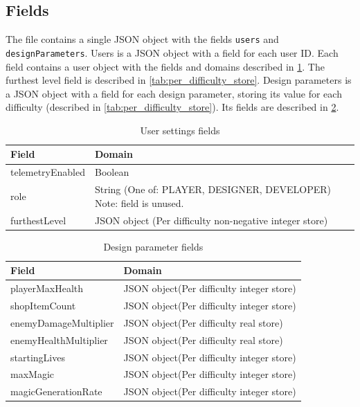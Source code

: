 \documentclass[11pt]{article}
\begin{document}
\subsection{Fields}
The file contains a single JSON object with the fields \verb|users| and \verb|designParameters|. Users is a JSON object with a field for each user ID. Each field contains a user object with the fields and domains described in \ref{tab:settings_users}. The furthest level field is described in \ref{tab:per_difficulty_store}. Design parameters is a JSON object with a field for each design parameter, storing its value for each difficulty (described in \ref{tab:per_difficulty_store}). Its fields are described in \ref{tab:settings_design_parameters}.
\begin{table}[H]
  \begin{center}
    \begin{tabularx}{\textwidth}{
        | >{\centering\arraybackslash\hsize=0.4\hsize}X
      | >{\centering\arraybackslash\hsize=0.6\hsize}X |}
      \hline
      \textbf{Field} & \textbf{Domain} \\
      \hline
      telemetryEnabled & Boolean \\
      \hline
      role & String (One of: PLAYER, DESIGNER, DEVELOPER) Note: field is unused. \\
      \hline
      furthestLevel & JSON object (Per difficulty non-negative integer store)\\
      \hline
    \end{tabularx}
    \caption{User settings fields}
    \label{tab:settings_users}
  \end{center}
\end{table}
\begin{table}[H]
  \begin{center}
    \begin{tabularx}{\textwidth}{
        | >{\centering\arraybackslash\hsize=0.4\hsize}X
      | >{\centering\arraybackslash\hsize=0.6\hsize}X |}
      \hline
      \textbf{Field} & \textbf{Domain} \\
      \hline
      playerMaxHealth & JSON object(Per difficulty integer store)\\
      \hline
      shopItemCount & JSON object(Per difficulty integer store)\\
      \hline
      enemyDamageMultiplier & JSON object(Per difficulty real store)\\
      \hline
      enemyHealthMultiplier & JSON object(Per difficulty real store) \\
      \hline
      startingLives & JSON object(Per difficulty integer store)\\
      \hline
      maxMagic & JSON object(Per difficulty integer store)\\
      \hline
      magicGenerationRate & JSON object(Per difficulty integer store) \\
      \hline
    \end{tabularx}
    \caption{Design parameter fields}
    \label{tab:settings_design_parameters}
  \end{center}
\end{table}
\end{document}
